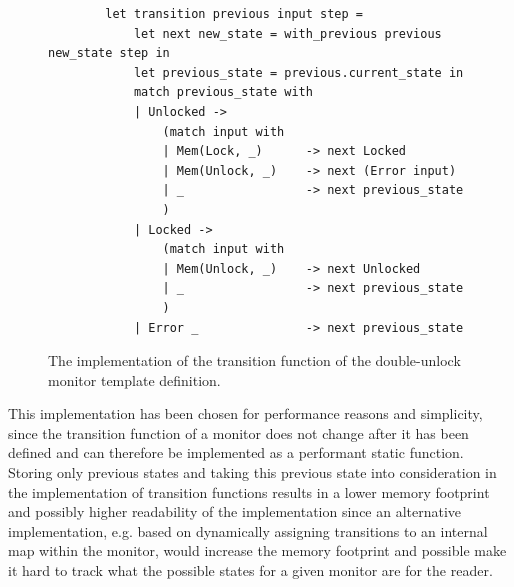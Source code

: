 \begin{figure}[H]
    \centering
    \begin{verbatim}
        let transition previous input step = 
            let next new_state = with_previous previous new_state step in
            let previous_state = previous.current_state in 
            match previous_state with 
            | Unlocked ->
                (match input with 
                | Mem(Lock, _)      -> next Locked
                | Mem(Unlock, _)    -> next (Error input)
                | _                 -> next previous_state
                )
            | Locked ->
                (match input with 
                | Mem(Unlock, _)    -> next Unlocked
                | _                 -> next previous_state
                )
            | Error _               -> next previous_state
    \end{verbatim}
    \caption{The implementation of the transition function of the double-unlock monitor template definition.}
    \label{transition-implementation}
\end{figure}

\newpar This implementation has been chosen for performance reasons and simplicity, since the transition function of a monitor does not change after it has been defined and can therefore be implemented as a performant static function. Storing only previous states and taking this previous state into consideration in the implementation of transition functions results in a lower memory footprint and possibly higher readability of the implementation since an alternative implementation, e.g. based on dynamically assigning transitions to an internal map within the monitor, would increase the memory footprint and possible make it hard to track what the possible states for a given monitor are for the reader.
